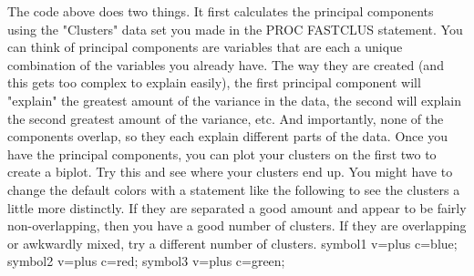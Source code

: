 \documentclass[a4paper,12pt]{article}
\begin{document}
The code above does two things. It first calculates the principal components using the "Clusters" data set you made in the PROC FASTCLUS statement. You can think of principal components are variables that are each a unique combination of the variables you already have. The way they are created (and this gets too complex to explain easily), the first principal component will "explain" the greatest amount of the variance in the data, the second will explain the second greatest amount of the variance, etc. And importantly, none of the components overlap, so they each explain different parts of the data.
Once you have the principal components, you can plot your clusters on the first two to create a biplot. Try this and see where your clusters end up. You might have to change the default colors with a statement like the following to see the clusters a little more distinctly. If they are separated a good amount and appear to be fairly non-overlapping, then you have a good number of clusters. If they are overlapping or awkwardly mixed, try a different number of clusters.
symbol1 v=plus c=blue;
symbol2 v=plus c=red;
symbol3 v=plus c=green;
\end{document}
